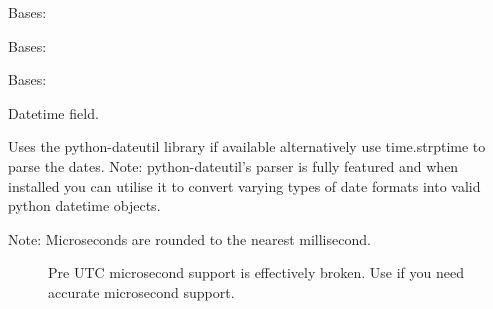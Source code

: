 \documentclass[letterpaper,10pt,english]{sphinxmanual}
\begin{document}
\begin{fulllineitems}
\label{\detokenize{user:user.User}}
Bases: 

\begin{fulllineitems}
\label{\detokenize{user:user.User.DoesNotExist}}
Bases: 

\end{fulllineitems}


\begin{fulllineitems}
\label{\detokenize{user:user.User.MultipleObjectsReturned}}
Bases: 

\end{fulllineitems}


\begin{fulllineitems}
\label{\detokenize{user:user.User.append_test}}
\end{fulllineitems}


\begin{fulllineitems}
\label{\detokenize{user:user.User.birthdate}}
Datetime field.

Uses the python-dateutil library if available alternatively use time.strptime
to parse the dates.  Note: python-dateutil's parser is fully featured and when
installed you can utilise it to convert varying types of date formats into valid
python datetime objects.
\begin{description}
\item[{Note: Microseconds are rounded to the nearest millisecond.}] \leavevmode
Pre UTC microsecond support is effectively broken.
Use  if you
need accurate microsecond support.


\end{description}
\end{fulllineitems}
\end{fulllineitems}
\end{document}
